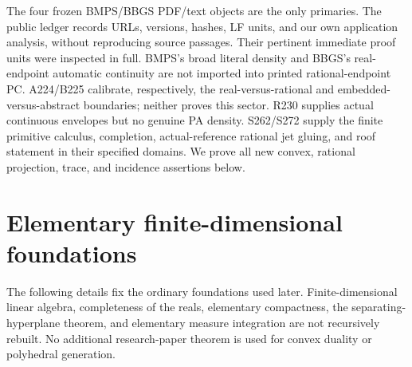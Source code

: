 \documentclass[11pt]{article}
\theoremstyle{definition}\newtheorem{definition}[theorem]{Definition}
\theoremstyle{remark}\newtheorem{remark}[theorem]{Remark}
\begin{document}
The four frozen BMPS/BBGS PDF/text objects are the only primaries. The public ledger records URLs, versions, hashes, LF units, and our own application analysis, without reproducing source passages. Their pertinent immediate proof units were inspected in full. BMPS's broad literal density and BBGS's real-endpoint automatic continuity are not imported into printed rational-endpoint PC. A224/B225 calibrate, respectively, the real-versus-rational and embedded-versus-abstract boundaries; neither proves this sector. R230 supplies actual continuous envelopes but no genuine PA density. S262/S272 supply the finite primitive calculus, completion, actual-reference rational jet gluing, and roof statement in their specified domains. We prove all new convex, rational projection, trace, and incidence assertions below.

\section{Elementary finite-dimensional foundations}
The following details fix the ordinary foundations used later. Finite-dimensional linear algebra, completeness of the reals, elementary compactness, the separating-hyperplane theorem, and elementary measure integration are not recursively rebuilt. No additional research-paper theorem is used for convex duality or polyhedral generation.
\end{document}
